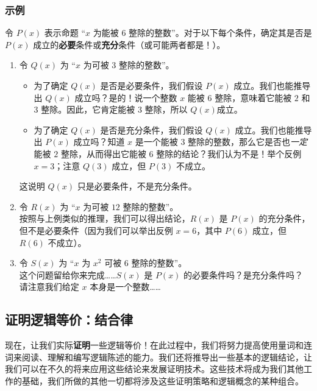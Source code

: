 \subsubsection*{示例}

\begin{example}
    令 $P(x)$ 表示命题 ``$x$ 为能被 $6$ 整除的整数''。对于以下每个条件，确定其是否是 $P(x)$ 成立的\textbf{必要}条件或\textbf{充分}条件（或可能两者都是！）。
    \begin{enumerate}[label=(\arabic*)]
        \item 令 $Q(x)$ 为 ``$x$ 为可被 $3$ 整除的整数''。
            \begin{itemize}
                \item 为了确定 $Q(x)$ 是否是必要条件，我们假设 $P(x)$ 成立。我们也能推导出 $Q(x)$ 成立吗？是的！说一个整数 $x$ 能被 $6$ 整除，意味着它能被 $2$ 和 $3$ 整除。因此，它肯定能被 $3$ 整除，所以 $Q(x)$成立。
                \item 为了确定 $Q(x)$ 是否是充分条件，我们假设 $Q(x)$ 成立。我们也能推导出 $P(x)$ 成立吗？知道 $x$ 是一个能被 $3$ 整除的整数，那么它是否也\emph{一定}能被 $2$ 整除，从而得出它能被 $6$ 整除的结论？我们认为不是！举个反例 $x = 3$；注意 $Q(3)$ 成立，但 $P(3)$ 不成立。
            \end{itemize}
            这说明 $Q(x)$ 只是必要条件，不是充分条件。
        \item 令 $R(x)$ 为 ``$x$ 为可被 $12$ 整除的整数''。\\
            按照与上例类似的推理，我们可以得出结论，$R(x)$ 是 $P(x)$ 的充分条件，但不是必要条件（因为我们可以举出反例 $x = 6$，其中 $P(6)$ 成立，但 $R(6)$ 不成立）。
        \item 令 $S(x)$ 为 ``$x$ 为 $x^2$ 可被 $6$ 整除的整数''。\\
            这个问题留给你来完成……$S(x)$ 是 $P(x)$ 的必要条件吗？是充分条件吗？\\
            请注意我们给定 $x$ 本身是一个整数……
    \end{enumerate}
\end{example}

\subsection{证明逻辑等价：结合律}

现在，让我们实际\textbf{证明}一些逻辑等价！在此过程中，我们将努力提高使用量词和连词来阅读、理解和编写逻辑陈述的能力。我们还将推导出一些基本的逻辑结论，让我们可以在不久的将来应用这些结论来发展证明技术。这些技术将成为我们其他工作的基础，我们所做的其他一切都将涉及这些证明策略和逻辑概念的某种组合。

